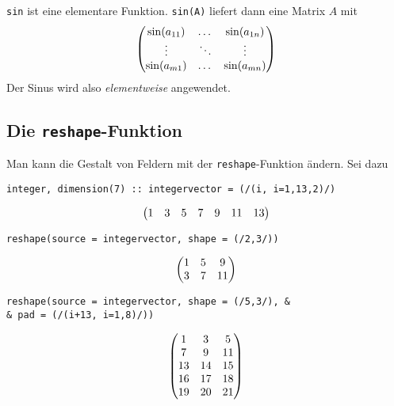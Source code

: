 \texttt{sin} ist eine elementare Funktion. \texttt{sin(A)} liefert dann eine Matrix $A$ mit
\begin{align}
	\begin{pmatrix}
		\sin(a_{11}) & \dots & \sin(a_{1n}) \\
		\vdots & \ddots & \vdots \\
		\sin(a_{m1}) & \dots & \sin(a_{mn})
	\end{pmatrix}\notag
\end{align}
Der Sinus wird also \textit{elementweise} angewendet.

\subsection{Die \texttt{reshape}-Funktion}

Man kann die Gestalt von Feldern mit der \texttt{reshape}-Funktion ändern. Sei dazu
\begin{lstlisting}
integer, dimension(7) :: integervector = (/(i, i=1,13,2)/)
\end{lstlisting}
\begin{align}
	\begin{pmatrix}
		1 & 3 & 5 & 7 & 9 & 11 & 13
	\end{pmatrix}\notag
\end{align}
\begin{lstlisting}
reshape(source = integervector, shape = (/2,3/))
\end{lstlisting}
\begin{align}
	\begin{pmatrix}
		1 & 5 & 9 \\
		3 & 7 & 11
	\end{pmatrix}\notag
\end{align}
\begin{lstlisting}
reshape(source = integervector, shape = (/5,3/), &
& pad = (/(i+13, i=1,8)/))
\end{lstlisting}
\begin{align}
	\begin{pmatrix}
		1 & 3 & 5 \\
		7 & 9 & 11 \\
		13 & 14 & 15 \\
		16 & 17 & 18 \\
		19 & 20 & 21
	\end{pmatrix}\notag
\end{align}